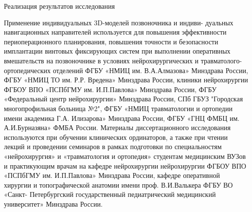 

         Реализация результатов исследования

	Применение индивидуальных 3D-моделей позвоночника и индиви-
дуальных        навигационных       направителей     используется       для     повышения
эффективности периоперационного планирования, повышения точности и
безопасности имплантации винтовых фиксирующих систем при выполнении
оперативных вмешательств на позвоночнике в условиях нейрохирургических и
травматолого-ортопедических отделений ФГБУ «НМИЦ им. В.А.Алмазова»
Минздрава России, ФГБУ «НМИЦ ТО им. Р.Р. Вредена» Минздрава России,
клиники нейрохирургии ФГБОУ ВПО «ПСПбГМУ им. И.П.Павлова» Минздрава
России, ФГБУ «Федеральный центр нейрохирургии» Минздрава России, СПб
ГБУЗ "Городская многопрофильная больница №2", ФГБУ «НМИЦ травматологии
и ортопедии имени академика Г.А. Илизарова» Минздрава России, ФГБУ «ГНЦ
ФМБЦ им. А.И.Бурназяна» ФМБА России. Материалы диссертационного
исследования используются при обучении клинических ординаторов, а также при
чтении лекций и проведении семинаров в рамках подготовки по специальностям
«нейрохирургия» и «травматология и ортопедия» студентам медицинским ВУЗов
и практикующим врачам на кафедре нейрохирургии нейрохирургии ФГБОУ ВПО
«ПСПбГМУ им. И.П.Павлова» Минздрава России, кафедре оперативной хирургии
и топографической анатомии имени проф. В.И.Валькера ФГБУ ВО «Санкт-
Петербургский государственный педиатрический медицинский университет»
Минздрава России.


